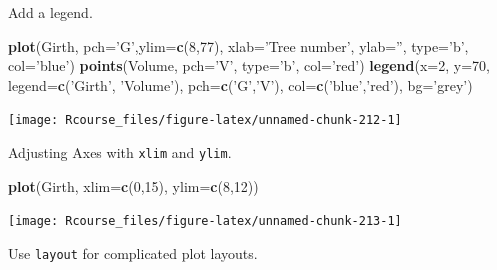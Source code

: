 \documentclass[]{book}
\newenvironment{Shaded}{\begin{snugshade}}{\end{snugshade}}
\newcommand{\KeywordTok}[1]{\textcolor[rgb]{0.13,0.29,0.53}{\textbf{#1}}}
\newcommand{\DataTypeTok}[1]{\textcolor[rgb]{0.13,0.29,0.53}{#1}}
\newcommand{\DecValTok}[1]{\textcolor[rgb]{0.00,0.00,0.81}{#1}}
\newcommand{\StringTok}[1]{\textcolor[rgb]{0.31,0.60,0.02}{#1}}
\newcommand{\NormalTok}[1]{#1}
\theoremstyle{definition}
\theoremstyle{definition}
\theoremstyle{definition}
\theoremstyle{remark}
\begin{document}
Add a legend.

\begin{Shaded}
\begin{Highlighting}[]
\KeywordTok{plot}\NormalTok{(Girth, }\DataTypeTok{pch=}\StringTok{'G'}\NormalTok{,}\DataTypeTok{ylim=}\KeywordTok{c}\NormalTok{(}\DecValTok{8}\NormalTok{,}\DecValTok{77}\NormalTok{), }\DataTypeTok{xlab=}\StringTok{'Tree number'}\NormalTok{, }\DataTypeTok{ylab=}\StringTok{''}\NormalTok{, }\DataTypeTok{type=}\StringTok{'b'}\NormalTok{, }\DataTypeTok{col=}\StringTok{'blue'}\NormalTok{)}
\KeywordTok{points}\NormalTok{(Volume, }\DataTypeTok{pch=}\StringTok{'V'}\NormalTok{, }\DataTypeTok{type=}\StringTok{'b'}\NormalTok{, }\DataTypeTok{col=}\StringTok{'red'}\NormalTok{)}
\KeywordTok{legend}\NormalTok{(}\DataTypeTok{x=}\DecValTok{2}\NormalTok{, }\DataTypeTok{y=}\DecValTok{70}\NormalTok{, }\DataTypeTok{legend=}\KeywordTok{c}\NormalTok{(}\StringTok{'Girth'}\NormalTok{, }\StringTok{'Volume'}\NormalTok{), }\DataTypeTok{pch=}\KeywordTok{c}\NormalTok{(}\StringTok{'G'}\NormalTok{,}\StringTok{'V'}\NormalTok{), }\DataTypeTok{col=}\KeywordTok{c}\NormalTok{(}\StringTok{'blue'}\NormalTok{,}\StringTok{'red'}\NormalTok{), }\DataTypeTok{bg=}\StringTok{'grey'}\NormalTok{)}
\end{Highlighting}
\end{Shaded}

\texttt{[image: Rcourse\_files/figure-latex/unnamed-chunk-212-1]}

Adjusting Axes with \texttt{xlim} and \texttt{ylim}.

\begin{Shaded}
\begin{Highlighting}[]
\KeywordTok{plot}\NormalTok{(Girth, }\DataTypeTok{xlim=}\KeywordTok{c}\NormalTok{(}\DecValTok{0}\NormalTok{,}\DecValTok{15}\NormalTok{), }\DataTypeTok{ylim=}\KeywordTok{c}\NormalTok{(}\DecValTok{8}\NormalTok{,}\DecValTok{12}\NormalTok{))}
\end{Highlighting}
\end{Shaded}

\texttt{[image: Rcourse\_files/figure-latex/unnamed-chunk-213-1]}

Use \texttt{layout} for complicated plot layouts.
\end{document}
